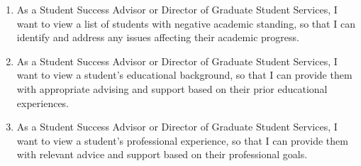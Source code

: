 \documentclass[12pt]{article}
\begin{document}
\begin{appendices}
\begin{enumerate}[label=(\roman*)]
\begin{enumerate}
            \item As a Student Success Advisor or Director of Graduate Student Services, I want to view a list of students with negative academic standing, so that I can identify and address any issues affecting their academic progress.
            \item As a Student Success Advisor or Director of Graduate Student Services, I want to view a student's educational background, so that I can provide them with appropriate advising and support based on their prior educational experiences.
            \item As a Student Success Advisor or Director of Graduate Student Services, I want to view a student's professional experience, so that I can provide them with relevant advice and support based on their professional goals.                     
        \end{enumerate}



\end{enumerate}
\end{appendices}
\end{document}
